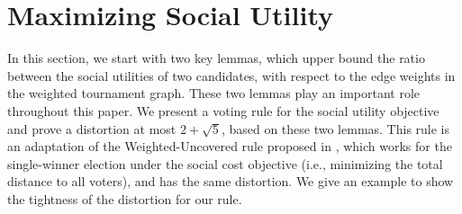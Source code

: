 \documentclass[11pt]{article}
\theoremstyle{remark}
\begin{document}
\section{Maximizing Social Utility}\label{sec:max}

In this section, we start with two key lemmas, which upper bound the ratio between the social utilities of two candidates, with respect to the edge weights in the weighted tournament graph. These two lemmas play an important role throughout this paper. We present a voting rule for the social utility objective and prove a distortion at most $2+\sqrt 5$, based on these two lemmas. This rule is an adaptation of the Weighted-Uncovered rule proposed in \cite{munagala2019improved}, which works for the single-winner election under the social cost objective (i.e., minimizing the total distance to all voters), and has the same distortion. We give an example to show the tightness of the distortion for our rule.



\end{document}
